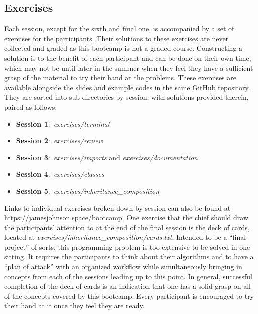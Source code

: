 \subsection{Exercises}
\label{sec:curriculum:exercises}
\noindent
Each session, except for the sixth and final one, is accompanied by a set of
exercises for the participants.
Their solutions to these exercises are never collected and graded as this
bootcamp is not a graded course.
Constructing a solution is to the benefit of each participant and can be done
on their own time, which may not be until later in the summer when they feel
they have a sufficient grasp of the material to try their hand at the problems.
These exercises are available alongside the slides and example codes in the
same GitHub repository.
They are sorted into sub-directories by session, with solutions provided
therein, paired as follows:
\begin{itemize}

	\item \textbf{Session 1}:~\textit{exercises/terminal}

	\item \textbf{Session 2}:~\textit{exercises/review}

	\item \textbf{Session 3}:~\textit{exercises/imports} and
	\textit{exercises/documentation}

	\item \textbf{Session 4}:~\textit{exercises/classes}

	\item \textbf{Session 5}:~\textit{exercises/inheritance\_composition}

\end{itemize}
Links to individual exercises broken down by session can also be found at \\
\url{https://jamesjohnson.space/bootcamp}.
One exercise that the chief should draw the participants' attention to at the
end of the final session is the deck of cards, located at
\textit{exercises/inheritance\_composition/cards.txt}.
Intended to be a ``final project'' of sorts, this programming problem is too
extensive to be solved in one sitting.
It requires the participants to think about their algorithms and to have a
``plan of attack'' with an organized workflow while simultaneously bringing in
concepts from each of the sessions leading up to this point.
In general, successful completion of the deck of cards is an indication that
one has a solid grasp on all of the concepts covered by this bootcamp.
Every participant is encouraged to try their hand at it once they feel they are
ready.

